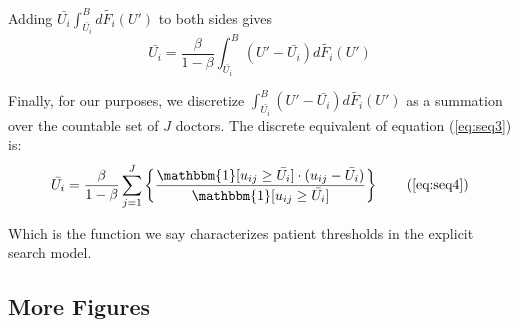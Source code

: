 \documentclass[../main.tex]{subfiles}
\begin{document}
Adding $\bar{U_i} \int_{\bar{U_i}}^B d \tilde{F_i}(U')$ to both sides gives
\begin{equation}
    \bar{U_i} = \frac{\beta}{1-\beta} \int_{\bar{U_i}}^B \left(U' - \bar{U_i}\right) d \tilde{F_i}(U')
    \label{eq:seq3}  
\end{equation}


Finally, for our purposes, we discretize $\int_{\bar{U_i}}^B \left(U' - \bar{U_i}\right) d \tilde{F_i}(U')$ as a summation over the countable set of $J$ doctors. The discrete equivalent of equation (\ref{eq:seq3}) is:
\begin{equation}
    \bar{U_i} = \frac{\beta}{1-\beta}  \sum_{j=1}^{J} \left\{ \frac{\mathbbm{1}[ u_{ij} \geq \bar{U_i} ] \cdot (u_{ij} - \bar{U_i})}{\mathbbm{1}[ u_{ij} \geq \bar{U_i} ]} \right\}
    \tag{\ref{eq:seq4}}  
\end{equation}

Which is the function we say characterizes patient thresholds in the explicit search model.

\newpage

\subsection{More Figures}
\label{sec:graphs}
\end{document}
